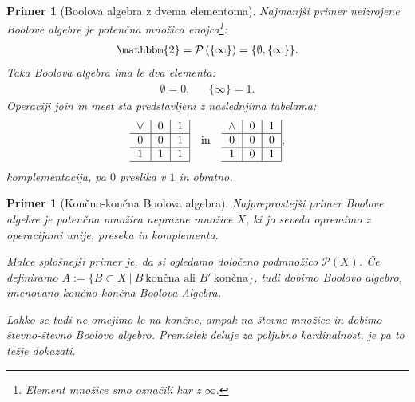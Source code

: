 \documentclass{amsart}
\newtheorem{primer}[izrek]{Primer}
\begin{document}
\begin{primer}[Boolova algebra z dvema elementoma]
    Najmanjši primer neizrojene Boolove algebre je potenčna množica enojca\footnote{Element množice smo označili kar z \(\infty\).}:
    \begin{align*}
        \mathbbm{2} = \mathcal{P}\left(\{\infty\}\right) = \{\emptyset, \{\infty\}\}.
    \end{align*}
    Taka Boolova algebra ima le dva elementa:
    \begin{align*}
        \emptyset = 0, && \{\infty\} = 1.
    \end{align*}
    Operaciji join in meet sta predstavljeni z naslednjima tabelama:
    \begin{align*}
    \begin{tabular}{c|c|c|}
        \(\vee\) & $0$ & $1$ \\
        \hline
        $0$ & \(0\) &$1$ \\
        \hline
        $1$ & \(1\) & $1$ \\
        \hline
    \end{tabular}&& \text{in} &&
    \begin{tabular}{c|c|c|}
        \(\wedge\) & $0$ & $1$ \\
        \hline
        $0$ & $0$ &$0$ \\
        \hline
        $1$ & $0$ & $1$ \\
        \hline
    \end{tabular},
\end{align*}
komplementacija, pa $0$ preslika v $1$ in obratno.
\end{primer}

\begin{primer}[Končno-končna Boolova algebra]
    Najpreprostejši primer Boolove algebre je potenčna množica neprazne množice \(X\), ki jo seveda opremimo z operacijami unije,
    preseka in komplementa. 
    
    Malce splošnejši primer je, da si ogledamo določeno podmnožico \(\mathcal{P}\left(X\right)\).
    Če definiramo \(A := \{B \subset X~|~B~\text{končna  ali } B'~\text{končna}\}\), tudi dobimo Boolovo algebro, imenovano
    končno-končna Boolova Algebra.

    Lahko se tudi ne omejimo le na končne, ampak na števne množice in dobimo števno-števno Boolovo algebro.
    Premislek deluje za poljubno kardinalnost, je pa to težje dokazati.
\end{primer}

\end{document}

